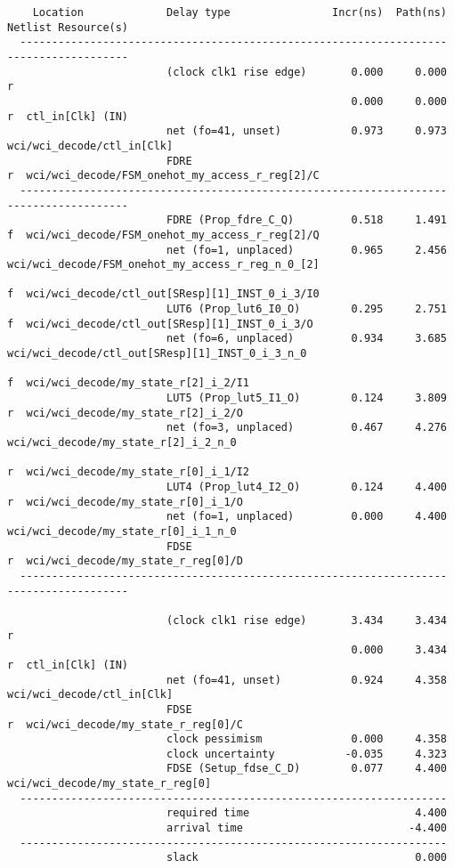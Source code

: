 \documentclass{article}
\begin{document}
\begin{lstlisting}
    Location             Delay type                Incr(ns)  Path(ns)    Netlist Resource(s)
  -------------------------------------------------------------------    -------------------
                         (clock clk1 rise edge)       0.000     0.000 r  
                                                      0.000     0.000 r  ctl_in[Clk] (IN)
                         net (fo=41, unset)           0.973     0.973    wci/wci_decode/ctl_in[Clk]
                         FDRE                                         r  wci/wci_decode/FSM_onehot_my_access_r_reg[2]/C
  -------------------------------------------------------------------    -------------------
                         FDRE (Prop_fdre_C_Q)         0.518     1.491 f  wci/wci_decode/FSM_onehot_my_access_r_reg[2]/Q
                         net (fo=1, unplaced)         0.965     2.456    wci/wci_decode/FSM_onehot_my_access_r_reg_n_0_[2]
                                                                      f  wci/wci_decode/ctl_out[SResp][1]_INST_0_i_3/I0
                         LUT6 (Prop_lut6_I0_O)        0.295     2.751 f  wci/wci_decode/ctl_out[SResp][1]_INST_0_i_3/O
                         net (fo=6, unplaced)         0.934     3.685    wci/wci_decode/ctl_out[SResp][1]_INST_0_i_3_n_0
                                                                      f  wci/wci_decode/my_state_r[2]_i_2/I1
                         LUT5 (Prop_lut5_I1_O)        0.124     3.809 r  wci/wci_decode/my_state_r[2]_i_2/O
                         net (fo=3, unplaced)         0.467     4.276    wci/wci_decode/my_state_r[2]_i_2_n_0
                                                                      r  wci/wci_decode/my_state_r[0]_i_1/I2
                         LUT4 (Prop_lut4_I2_O)        0.124     4.400 r  wci/wci_decode/my_state_r[0]_i_1/O
                         net (fo=1, unplaced)         0.000     4.400    wci/wci_decode/my_state_r[0]_i_1_n_0
                         FDSE                                         r  wci/wci_decode/my_state_r_reg[0]/D
  -------------------------------------------------------------------    -------------------

                         (clock clk1 rise edge)       3.434     3.434 r  
                                                      0.000     3.434 r  ctl_in[Clk] (IN)
                         net (fo=41, unset)           0.924     4.358    wci/wci_decode/ctl_in[Clk]
                         FDSE                                         r  wci/wci_decode/my_state_r_reg[0]/C
                         clock pessimism              0.000     4.358    
                         clock uncertainty           -0.035     4.323    
                         FDSE (Setup_fdse_C_D)        0.077     4.400    wci/wci_decode/my_state_r_reg[0]
  -------------------------------------------------------------------
                         required time                          4.400    
                         arrival time                          -4.400    
  -------------------------------------------------------------------
                         slack                                  0.000    





\end{lstlisting}
\end{document}
